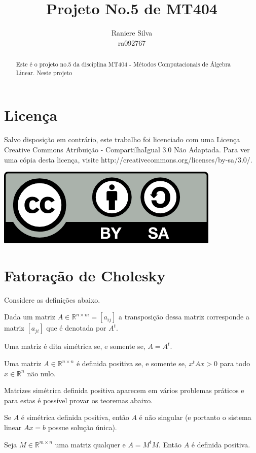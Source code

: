 \documentclass[12pt,a4paper]{article}
\begin{document}
\title{Projeto No.5 de MT404}
\author{Raniere Silva \\ ra092767}
\maketitle
\begin{abstract}
    Este \'{e} o projeto no.5 da disciplina MT404 - M\'{e}todos Computacionais
    de \'{A}lgebra Linear. Neste projeto 
\end{abstract}
\tableofcontents
\lstlistoflistings
\section*{Licen\c{c}a}
Salvo disposi\c{c}\~{a}o em contr\'{a}rio, este trabalho foi licenciado com uma
Licen\c{c}a Creative Commons Atribui\c{c}\~{a}o - CompartilhaIgual 3.0 N\~{a}o
Adaptada. Para ver uma c\'{o}pia desta licen\c{c}a, visite
http://creativecommons.org/licenses/by-sa/3.0/.
\begin{center}
    \includegraphics{../figuras/cc-by-sa.png}
\end{center}
\newpage
\section{Fatora\c{c}\~{a}o de Cholesky}
Considere as definições abaixo.
\begin{defi}[Transposição]
    Dada um matriz $A \in \mathbb{R}^{n \times m} = [a_{ij}]$ a transposição
    dessa matriz corresponde a matriz $[a_{ji}]$ que é denotada por $A^t$.
\end{defi}
\begin{defi}
    Uma matriz é dita simétrica se, e somente se, $A = A^t$.
\end{defi}
\begin{defi}
    Uma matriz $A \in \mathbb{R}^{n \times n}$ é definida positiva se, e somente
    se, $x^t A x > 0$ para todo $x \in \mathbb{R}^n$ não nulo.
\end{defi}

Matrizes simétrica definida positiva aparecem em vários problemas práticos e
para estas é possível provar os teoremas abaixo.
\begin{teo}
    Se $A$ é simétrica definida positiva, então $A$ é não singular (e portanto o
    sistema linear $A x = b$ possue solução única).
\end{teo}
\begin{teo}
    Seja $M \in \mathbb{R}^{m \times n}$ uma matriz qualquer e $A = M^t M$.
    Então $A$ é definida positiva.
\end{teo}
\end{document}
